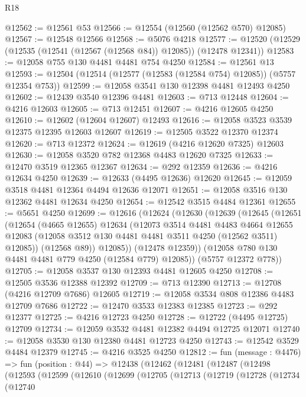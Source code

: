 \begin{lexlean}{R18}
\begin{coremodule}
@12562 := @12561 @53
@12566 := @12554 (@12560 (@12562 @570) @12085)
@12567 := @12548 @12566
@12568 := @5076 @4218
@12577 := @12520 (@12529 (@12535 (@12541 (@12567 (@12568 @84)) @12085)) (@12478 @12341))
@12583 := @12058 @755 @130 @4481 @4481 @754 @4250
@12584 := @12561 @13
@12593 := @12504 (@12514 (@12577 (@12583 (@12584 @754) @12085)) (@5757 @12354 @753))
@12599 := @12058 @3541 @130 @12398 @4481 @12493 @4250
@12602 := @12439 @3540 @12396 @4481
@12603 := @713 @12448
@12604 := @4216 @12603
@12605 := @713 @12451
@12607 := @4216 @12605 @4250
@12610 := @12602 (@12604 @12607) @12493
@12616 := @12058 @3523 @3539 @12375 @12395 @12603 @12607
@12619 := @12505 @3522 @12370 @12374
@12620 := @713 @12372
@12624 := @12619 (@4216 @12620 @7325) @12603
@12630 := @12058 @3520 @782 @12368 @4483 @12620 @7325
@12633 := @12470 @3519 @12365 @12367
@12634 := @292 @12359
@12636 := @4216 @12634 @4250
@12639 := @12633 (@4495 @12636) @12620
@12645 := @12059 @3518 @4481 @12364 @4494 @12636 @12071
@12651 := @12058 @3516 @130 @12362 @4481 @12634 @4250
@12654 := @12542 @3515 @4484 @12361
@12655 := @5651 @4250
@12699 := @12616
    (@12624
      (@12630
        (@12639
          (@12645
            (@12651
              (@12654
                (@4665 @12655)
                @12634
                (@12073
                  @3514
                  @4481
                  @4483
                  @4664
                  @12655
                  @12083
                  (@12058 @3512 @130 @4481 @4481 @3511 @4250 (@12562 @3511) @12085))
                (@12568 @89))
              @12085))
          (@12478 @12359))
        (@12058 @780 @130 @4481 @4481 @779 @4250 (@12584 @779) @12085))
      (@5757 @12372 @778))
@12705 := @12058 @3537 @130 @12393 @4481 @12605 @4250
@12708 := @12505 @3536 @12388 @12392
@12709 := @713 @12390
@12713 := @12708 (@4216 @12709 @7686) @12605
@12719 := @12058 @3534 @808 @12386 @4483 @12709 @7686
@12722 := @12470 @3533 @12383 @12385
@12723 := @292 @12377
@12725 := @4216 @12723 @4250
@12728 := @12722 (@4495 @12725) @12709
@12734 := @12059 @3532 @4481 @12382 @4494 @12725 @12071
@12740 := @12058 @3530 @130 @12380 @4481 @12723 @4250
@12743 := @12542 @3529 @4484 @12379
@12745 := @4216 @3525 @4250
@12812 := fun (message : @4476) =>
  fun (position : @44) =>
  @12438
    (@12462
      (@12481
        (@12487
          (@12498
            (@12593
              (@12599
                (@12610
                  (@12699
                    (@12705
                      (@12713
                        (@12719
                          (@12728
                            (@12734
                              (@12740

\end{coremodule}
\end{lexlean}

